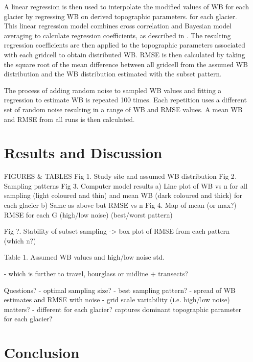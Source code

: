 \documentclass[twocolumn, letterpaper]{igs}
\begin{document}
A linear regression is then used to interpolate the modified values of WB for each glacier by regressing WB on derived topographic parameters. for each glacier. This linear regression model combines cross correlation and Bayesian model averaging to calculate regression coefficients, as described in \cite{Pulwicki2017}. The resulting regression coefficients are then applied to the topographic parameters associated with each gridcell to obtain distributed WB. RMSE is then calculated by taking the square root of the mean difference between all gridcell from the assumed WB distribution and the WB distribution estimated with the subset pattern.

The process of adding random noise to sampled WB values and fitting a regression to estimate WB is repeated 100 times. Each repetition uses a different set of random noise resulting in a range of WB and RMSE values. A mean WB and RMSE from all runs is then calculated. 


\section{Results and Discussion}

FIGURES & TABLES
Fig 1. Study site and assumed WB distribution
Fig 2. Sampling patterns
Fig 3. Computer model results  
	a) Line plot of WB vs n for all sampling (light coloured and thin) and mean WB (dark coloured and thick) for each glacier
	b) Same as above but RMSE vs n 
Fig 4. Map of mean (or max?) RMSE for each G (high/low noise) (best/worst pattern)

Fig ?. Stability of subset sampling -> box plot of RMSE from each pattern (which n?)

Table 1. Assumed WB values and high/low noise std.


- which is further to travel, hourglass or midline + transects?


Questions?
- optimal sampling size?
- best sampling pattern?
- spread of WB estimates and RMSE with noise
- grid scale variability (i.e. high/low noise) matters?
- different for each glacier? captures dominant topographic parameter for each glacier?

\section{Conclusion}
\end{document}
